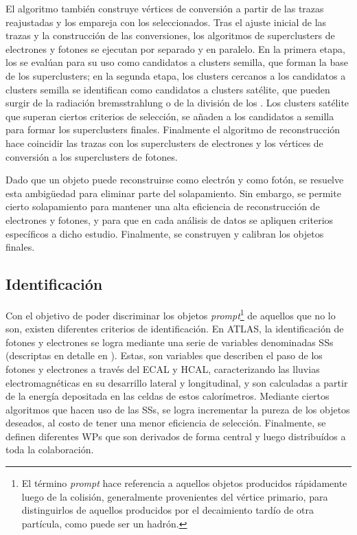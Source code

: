 El algoritmo también construye vértices de conversión a partir de las trazas reajustadas y los empareja con los \topos seleccionados.
Tras el ajuste inicial de las trazas y la construcción de las conversiones, los algoritmos de superclusters de electrones y fotones se ejecutan por separado y en paralelo. En la primera etapa, los \topos se evalúan para su uso como candidatos a clusters semilla, que forman la base de los superclusters; en la segunda etapa, los clusters cercanos a los candidatos a clusters semilla se identifican como candidatos a clusters satélite, que pueden surgir de la radiación bremsstrahlung o de la división de los \topos. Los clusters satélite que superan ciertos criterios de selecci\'on, se añaden a los candidatos a semilla para formar los superclusters finales.
Finalmente el algoritmo de reconstrucción hace coincidir las trazas con los superclusters de electrones y los vértices de conversión a los superclusters de fotones.

Dado que un objeto puede reconstruirse como electrón y como fotón, se resuelve esta ambigüedad para eliminar parte del solapamiento. Sin embargo, se permite cierto solapamiento para mantener una alta eficiencia de reconstrucción de electrones y fotones, y para que en cada an\'alisis de datos se apliquen criterios espec\'ificos a dicho estudio. Finalmente, se construyen y calibran los objetos finales.



\subsection{Identificaci\'on}
\label{subsec:objects:egamma:id}

Con el objetivo de poder discriminar los objetos \textit{prompt}\footnote{El término \textit{prompt} hace referencia a aquellos objetos producidos rápidamente luego de la colisión, generalmente provenientes del vértice primario, para distinguirlos de aquellos producidos por el decaimiento tardío de otra partícula, como puede ser un hadrón.} de aquellos que no lo son, existen diferentes criterios de identificaci\'on.
En \ac{ATLAS}, la identificaci\'on de fotones y electrones se logra mediante una serie de variables denominadas \acfp{SS} (descriptas en detalle en \Ch{\ref{ch:pid_ss}}). Estas, son variables que describen el paso de los fotones y electrones a trav\'es del \ac{ECAL} y \ac{HCAL}, caracterizando las lluvias electromagnéticas en su desarrillo lateral y longitudinal, y son calculadas a partir de la energ\'ia depositada en las celdas de estos calor\'imetros. Mediante ciertos algoritmos que hacen uso de las \acp{SS}, se logra incrementar la pureza de los objetos deseados, al costo de tener una menor eficiencia de selecci\'on.
Finalmente, se definen diferentes \acp{WP} que son derivados de forma central y luego distribu\'idos a toda la colaboraci\'on.

